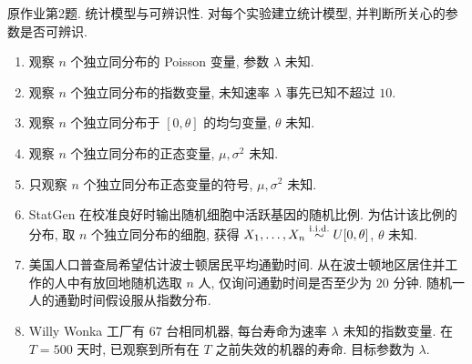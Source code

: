 \begin{exercise}\label{ps02:p02}
原作业第2题. 统计模型与可辨识性. 对每个实验建立统计模型, 并判断所关心的参数是否可辨识.
\begin{enumerate}[label=\arabic*.]
\item 观察 $n$ 个独立同分布的 Poisson 变量, 参数 $\lambda$ 未知.
\item 观察 $n$ 个独立同分布的指数变量, 未知速率 $\lambda$ 事先已知不超过 $10$.
\item 观察 $n$ 个独立同分布于 $[0,\theta]$ 的均匀变量, $\theta$ 未知.
\item 观察 $n$ 个独立同分布的正态变量, $\mu,\sigma^2$ 未知.
\item 只观察 $n$ 个独立同分布正态变量的符号, $\mu,\sigma^2$ 未知.
\item StatGen 在校准良好时输出随机细胞中活跃基因的随机比例. 为估计该比例的分布, 取 $n$ 个独立同分布的细胞, 获得 $X_1,\ldots,X_n\stackrel{\mathrm{i.i.d.}}{\sim} U[0,\theta]$, $\theta$ 未知.
\item 美国人口普查局希望估计波士顿居民平均通勤时间. 从在波士顿地区居住并工作的人中有放回地随机选取 $n$ 人, 仅询问通勤时间是否至少为 $20$ 分钟. 随机一人的通勤时间假设服从指数分布.
\item Willy Wonka 工厂有 $67$ 台相同机器, 每台寿命为速率 $\lambda$ 未知的指数变量. 在 $T=500$ 天时, 已观察到所有在 $T$ 之前失效的机器的寿命. 目标参数为 $\lambda$.
\end{enumerate}
\end{exercise}
